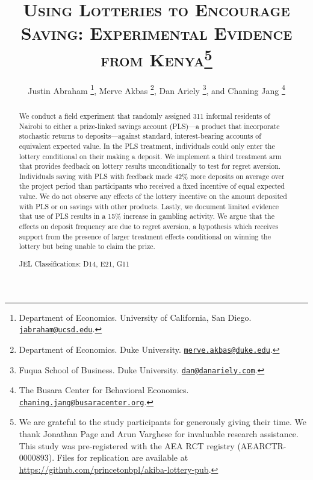 \documentclass[11pt]{article}
\begin{document}
\title{\textsc{Using Lotteries to Encourage Saving: Experimental Evidence from Kenya}\protect\footnote{We are grateful to the study participants for generously giving their time. We thank Jonathan Page and Arun Varghese for invaluable research assistance. This study was pre-registered with the AEA RCT registry (AEARCTR-0000893). Files for replication are available at \url{https://github.com/princetonbpl/akiba-lottery-pub}.}}

\author{
	Justin Abraham
		\thanks{Department of Economics. University of California, San Diego. \protect\href{mailto:jabraham@ucsd.edu}{\nolinkurl{jabraham@ucsd.edu}}.},
	Merve Akbas
		\thanks{Department of Economics. Duke University. \protect\href{mailto:merve.akbas@duke.edu}{\nolinkurl{merve.akbas@duke.edu}}.},
	Dan Ariely
		\thanks{Fuqua School of Business. Duke University. \protect\href{mailto:dan@danariely.com}{\nolinkurl{dan@danariely.com}}.}, and
	Chaning Jang
		\thanks{The Busara Center for Behavioral Economics. \protect\href{mailto:chaning.jang@busaracenter.org}{\nolinkurl{chaning.jang@busaracenter.org}}.}
}

\maketitle

	\begin{abstract}

		We conduct a field experiment that randomly assigned 311 informal residents of Nairobi to either a prize-linked savings account (PLS)---a product that incorporate stochastic returns to deposits---against standard, interest-bearing accounts of equivalent expected value. In the PLS treatment, individuals could only enter the lottery conditional on their making a deposit. We implement a third treatment arm that provides feedback on lottery results unconditionally to test for regret aversion. Individuals saving with PLS with feedback made 42\% more deposits on average over the project period than participants who received a fixed incentive of equal expected value. We do not observe any effects of the lottery incentive on the amount deposited with PLS or on savings with other products. Lastly, we document limited evidence that use of PLS results in a 15\% increase in gambling activity. We argue that the effects on deposit frequency are due to regret aversion, a hypothesis which receives support from the presence of larger treatment effects conditional on winning the lottery but being unable to claim the prize.


		\medskip \noindent
		JEL Classifications: D14, E21, G11

 	\end{abstract}
\end{document}
